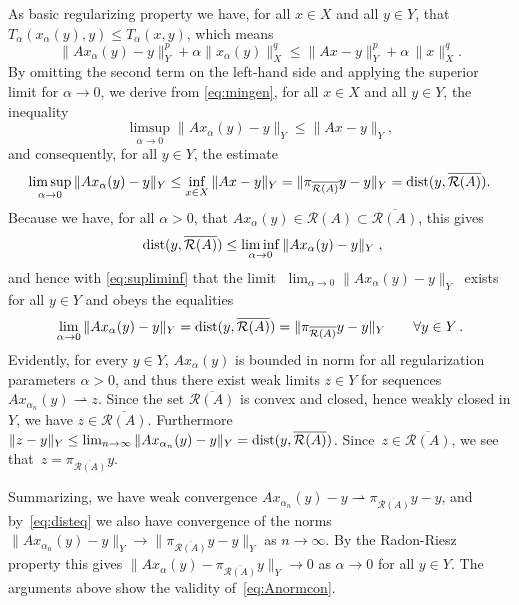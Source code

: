 \documentclass[12pt]{amsart}
\newcommand{\domain}{\mathcal D}
\newcommand{\range}{\mathcal R}
\newcommand{\Ad}{A^\dag}
\newcommand{\pr}{\pi_{\overline{\range(A)}}}
\theoremstyle{remark}
\begin{document}
As basic regularizing property we have, for all $x \in X$ and all $y \in Y$, that $ T_\alpha(x_\alpha(y),y) \le T_\alpha(x,y)$,  which means
\begin{equation} \label{eq:mingen}
\|Ax_\alpha(y)-y\|_Y^p +\alpha\|x_\alpha(y)\|^q_X \le  \|Ax-y\|_Y^p +\alpha\,\|x\|_X^q. 
\end{equation}
By omitting the second term on the left-hand side and applying the superior limit for $\alpha \to 0$, we derive from
\eqref{eq:mingen}, for all $x \in X$ and all $y \in Y$,  the inequality
\begin{equation} \label{eq:suplimgen}
\limsup_{\alpha \to 0} \|Ax_\alpha(y)-y\|_Y \le \|Ax-y\|_Y,    
\end{equation}
and consequently, for all $y \in Y$, the estimate
\begin{equation} \label{eq:supliminf}
\limsup_{\alpha \to 0} \|Ax_\alpha(y)-y\|_Y \le \inf_{x \in X}\|Ax-y\|_Y=\|\pr y -y\|_Y= {\rm dist}(y,\overline{\range(A)}). 
\end{equation}
Because we have, for all $\alpha>0$, that $Ax_\alpha(y) \in \range(A) \subset \overline{\range(A)}$, this gives
$$\;\,{\rm dist}(y,\overline{\range(A)}) \le \liminf_{\alpha \to 0}\|Ax_\alpha(y)-y\|_Y\;,
$$
and hence with \eqref{eq:supliminf} that the limit $\;\lim_{\alpha \to 0}\|Ax_\alpha(y)-y\|_Y\;$ exists for all $y \in Y$ 
and obeys the equalities
\begin{equation} \label{eq:disteq}
\lim_{\alpha \to 0}\|Ax_\alpha(y)-y\|_Y={\rm dist}(y,\overline{\range(A)})=\|\pr y -y\|_Y \qquad \forall y \in Y \,.
\end{equation}
Evidently, for every $y \in Y$, $Ax_\alpha(y)$ is bounded in norm for all regularization parameters $\alpha>0$, and thus there exist weak limits $z \in Y$ for sequences
$Ax_{\alpha_n}(y) \rightharpoonup z$. Since the set $\overline{\range(A)}$ is convex and closed, hence weakly closed in $Y$,
we have $z \in \overline{\range(A)}$. 
Furthermore $\|z-y\|_Y \le \lim_{n \to \infty}\|Ax_{\alpha_n}(y)-y\|_Y
={\rm dist}(y,\overline{\range(A)})$.
Since~$z \in \overline{\range(A)}$, we see that~$z=\pr y$. 

Summarizing, we have weak convergence $Ax_{\alpha_n}(y)-y \rightharpoonup \pr y-y$, and by~\eqref{eq:disteq} we also  have convergence of the norms
$\|Ax_{\alpha_n}(y)-y\|_Y \to \|\pr y-y\|_Y$ as $n \to \infty$. By the Radon-Riesz property this gives $\|Ax_\alpha(y) - \pr y\|_Y \to 0$ as $ \alpha \to 0$ for all $y \in Y$. The arguments above show the validity of~\eqref{eq:Anormcon}.
\end{document}
